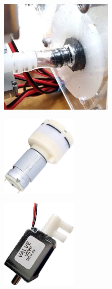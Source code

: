 \documentclass[twoside, 11pt]{article}
\begin{document}
\begin{figure}[H]
	\centering
	\begin{subfigure}[t]{0.25\linewidth}
		\centering
		\includegraphics[width=0.6\textwidth]{air_connection}
	\end{subfigure}%
	\begin{subfigure}[t]{0.25\linewidth}
		\centering		
		\includegraphics[width=0.4\textwidth]{air pump}
	\end{subfigure}%
	\begin{subfigure}[t]{0.25\linewidth}
		\centering
		\includegraphics[width=0.4\textwidth]{solenoid valve}

\end{subfigure}
\end{figure}
\end{document}
